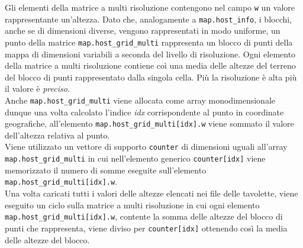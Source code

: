 			Gli elementi della matrice a multi risoluzione contengono nel campo \texttt{w} un valore rappresentante un'altezza. Dato che, analogamente a \texttt{map.host\_info}, i blocchi, anche se di dimensioni diverse, vengono rappresentati in modo uniforme, un punto della matrice \texttt{map.host\_grid\_multi} rappresenta un blocco di punti della mappa di dimensioni variabili a seconda del livello di risoluzione. Ogni elemento della matrice a multi risoluzione contiene co\`{i} una media delle altezze del terreno del blocco di punti rappresentato dalla singola cella. Pi\`{u} la risoluzione \`{e} alta pi\`{u} il valore \`{e} \textit{preciso}.\\
			Anche \texttt{map.host\_grid\_multi} viene allocata come array monodimensionale dunque una volta calcolato l'indice \textit{idx} corrispondente al punto in coordinate geografiche, all'elemento \texttt{map.host\_grid\_multi[idx].w} viene sommato il valore dell'altezza relativa al punto.\\
			Viene utilizzato un vettore di supporto \texttt{counter} di dimensioni uguali all'array \texttt{map.host\_grid\_multi} in cui nell'elemento generico \texttt{counter[idx]} viene memorizzato il numero di somme eseguite sull'elemento \texttt{map.host\_grid\_multi[idx].w}.\\
			Una volta caricati tutti i valori delle altezze elencati nei file delle tavolette, viene eseguito un ciclo sulla matrice a multi risoluzione in cui ogni elemento \texttt{map.host\_grid\_multi[idx].w}, contente la somma delle altezze del blocco di punti che rappresenta, viene diviso per \texttt{counter[idx]} ottenendo cos\`{i} la media delle altezze del blocco.\\

